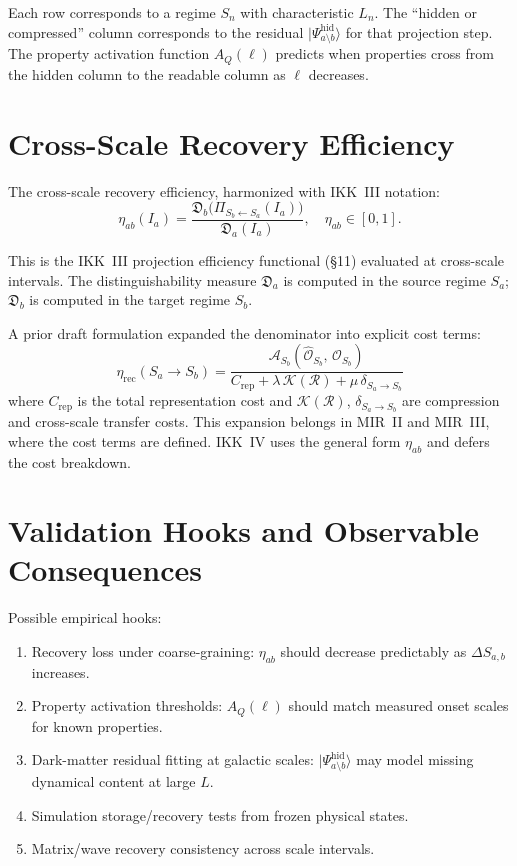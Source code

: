 \documentclass[11pt,a4paper,oneside]{article}
\newcommand{\Ia}{I_a}                               %
\newcommand{\DSab}{\Delta S_{a,b}}             %
\newcommand{\PiS}[2]{\Pi_{S_{#2}\leftarrow S_{#1}}}  %
\newcommand{\etaab}{\eta_{ab}}                 %
\newcommand{\D}{\mathfrak{D}}                  %
\newcommand{\AQ}{A_Q(\ell)}                    %
\begin{document}
Each row corresponds to a regime $S_n$ with characteristic $L_n$. The ``hidden or compressed'' column corresponds to the residual $|\Psi^{\mathrm{hid}}_{a\setminus b}\rangle$ for that projection step. The property activation function $A_Q(\ell)$ predicts when properties cross from the hidden column to the readable column as $\ell$ decreases.

\section{Cross-Scale Recovery Efficiency}

The cross-scale recovery efficiency, harmonized with IKK~III notation:
\[
\boxed{
\etaab(\Ia) = \frac{\D_b\!\big(\PiS{a}{b}(\Ia)\big)}{\D_a(\Ia)},\quad
\etaab \in [0,1].
}
\]

This is the IKK~III projection efficiency functional (\S{}11) evaluated at cross-scale intervals. The distinguishability measure $\D_a$ is computed in the source regime $S_a$; $\D_b$ is computed in the target regime $S_b$.

A prior draft formulation expanded the denominator into explicit cost terms:
\[
\eta_{\mathrm{rec}}(S_a \to S_b) =
\frac{\mathcal{A}_{S_b}(\hat{\mathcal{O}}_{S_b},\, \mathcal{O}_{S_b})}
     {C_{\mathrm{rep}} + \lambda\,\mathcal{K}(\mathcal{R}) + \mu\,\delta_{S_a \to S_b}}
\]
where $C_{\mathrm{rep}}$ is the total representation cost and $\mathcal{K}(\mathcal{R})$, $\delta_{S_a\to S_b}$ are compression and cross-scale transfer costs. This expansion belongs in MIR~II and MIR~III, where the cost terms are defined. IKK~IV uses the general form $\etaab$ and defers the cost breakdown.

\section{Validation Hooks and Observable Consequences}

Possible empirical hooks:
\begin{enumerate}
\item Recovery loss under coarse-graining: $\etaab$ should decrease predictably as $\DSab$ increases.
\item Property activation thresholds: $\AQ$ should match measured onset scales for known properties.
\item Dark-matter residual fitting at galactic scales: $|\Psi^{\mathrm{hid}}_{a\setminus b}\rangle$ may model missing dynamical content at large $L$.
\item Simulation storage/recovery tests from frozen physical states.
\item Matrix/wave recovery consistency across scale intervals.
\end{enumerate}
\end{document}
